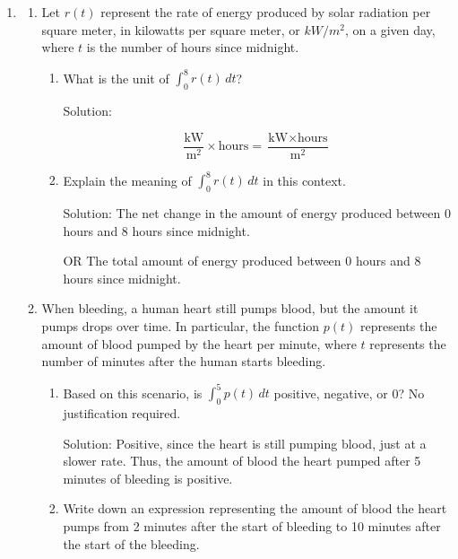 \documentclass[11pt]{article}
\begin{document}
\begin{enumerate}
\item 

\begin{enumerate}
    \item Let $r(t)$ represent the rate of energy produced by solar radiation per square meter, in kilowatts per square meter, or $kW/m^2$, on a given day, where $t$ is the number of hours since midnight.

    \begin{enumerate}
        \item[(i)] What is the unit of $\displaystyle\int_0^8 r(t)\, dt$?

        {\color{blue}Solution:
        
        $$\frac{\text{kW}}{\text{m}^2} \times \text{hours} = \frac{\text{kW} \times \text{hours}}{\text{m}^2}$$
        }

        \vfill

        \item[(ii)] Explain the meaning of $\displaystyle\int_0^8 r(t)\, dt$ in this context.

        {\color{blue}Solution: The net change in the amount of energy produced between 0 hours and 8 hours since midnight.
    
        OR The total amount of energy produced between 0 hours and 8 hours since midnight.}

        \vfill 
    \end{enumerate}

    \vfill

    \item When bleeding, a human heart still pumps blood, but the amount it pumps drops over time. In particular, the function $p(t)$ represents the amount of blood pumped by the heart per minute, where $t$ represents the number of minutes after the human starts bleeding.

    \begin{enumerate}
        \item[(i)] Based on this scenario, is $\displaystyle \int_0^5 p(t)\, dt$ positive, negative, or 0? No justification required.

        {\color{blue}Solution: Positive, since the heart is still pumping blood, just at a slower rate. Thus, the amount of blood the heart pumped after 5 minutes of bleeding is positive.}

        \vfill

        \item[(ii)] Write down an expression representing the amount of blood the heart pumps from 2 minutes after the start of bleeding to 10 minutes after the start of the bleeding.


\end{enumerate}
\end{enumerate}
\end{enumerate}
\end{document}
